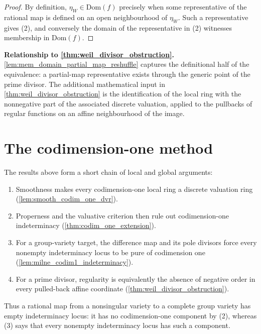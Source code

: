 \begin{proof}

  By definition, \(\eta_W\in\mathrm{Dom}(f)\) precisely when some
  representative of the rational map is defined on an open neighbourhood of
  \(\eta_W\).  Such a representative gives (2), and conversely the domain of
  the representative in (2) witnesses membership in \(\mathrm{Dom}(f)\).
\end{proof}

\begin{remark}
  \label{rmk:mem_domain_partial_map_reshuffle_scope}
  \textbf{Relationship to \cref{thm:weil_divisor_obstruction}.}
  \cref{lem:mem_domain_partial_map_reshuffle} captures the definitional half of
  the equivalence: a partial-map representative exists through the generic point
  of the prime divisor. The additional mathematical input in
  \cref{thm:weil_divisor_obstruction} is the identification of the local ring with
  the nonnegative part of the associated discrete valuation, applied to the
  pullbacks of regular functions on an affine neighbourhood of the image.
\end{remark}

\section{The codimension-one method}
\label{sec:codim1_lean_encoding}

The results above form a short chain of local and global arguments:
\begin{enumerate}
  \item Smoothness makes every codimension-one local ring a discrete
    valuation ring (\cref{lem:smooth_codim_one_dvr}).
  \item Properness and the valuative criterion then rule out
    codimension-one indeterminacy (\cref{thm:codim_one_extension}).
  \item For a group-variety target, the difference map and its pole
    divisors force every nonempty indeterminacy locus to be pure of
    codimension one (\cref{lem:milne_codim1_indeterminacy}).
  \item For a prime divisor, regularity is equivalently the absence of
    negative order in every pulled-back affine coordinate
    (\cref{thm:weil_divisor_obstruction}).
\end{enumerate}
Thus a rational map from a nonsingular variety to a complete group variety
has empty indeterminacy locus: it has no codimension-one component by (2),
whereas (3) says that every nonempty indeterminacy locus has such a component.

